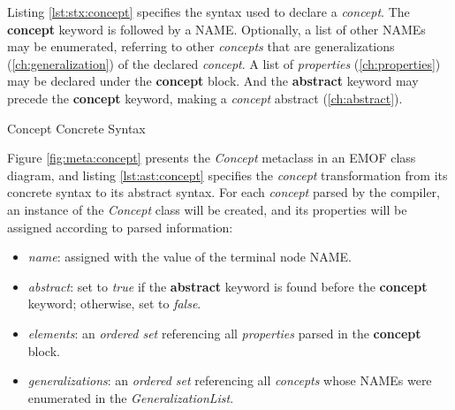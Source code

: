 Listing \ref{lst:stx:concept} specifies the syntax used
to declare a \emph{concept}.
The \textbf{concept} keyword is followed by a NAME.
Optionally, a list of other NAMEs may be enumerated,
referring to other \emph{concepts}
that are generalizations (\ref{ch:generalization}) of the declared \emph{concept}.
A list of \emph{properties} (\ref{ch:properties}) may be declared under the \textbf{concept} block.
And the \textbf{abstract} keyword may precede the \textbf{concept} keyword, making a \emph{concept} abstract (\ref{ch:abstract}).

\begin{code}
\verbatimfont{\small}

\caption{Concept Concrete Syntax}
\label{lst:stx:concept}
\end{code}

Figure \ref{fig:meta:concept} presents the \emph{Concept} metaclass
in an EMOF \cite{mof} class diagram,
and listing \ref{lst:ast:concept} specifies
the \emph{concept} transformation
from its concrete syntax to its abstract syntax.
For each \emph{concept} parsed by the compiler,
an instance of the \emph{Concept} class will be created,
and its properties will be assigned
according to parsed information:

\begin{itemize}

\item \emph{name}:
assigned with the value of the terminal node NAME.

\item \emph{abstract}:
set to \emph{true} if the \textbf{abstract} keyword
is found before the \textbf{concept} keyword;
otherwise, set to \emph{false}.

\item \emph{elements}:
an \emph{ordered set} referencing all \emph{properties}
parsed in the \textbf{concept} block.

\item \emph{generalizations}:
an \emph{ordered set} referencing all \emph{concepts}
whose NAMEs were enumerated in the \emph{GeneralizationList}.

\end{itemize}

